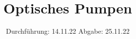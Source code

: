 

\subject{V21}
\title{Optisches Pumpen}
\date{%
  Durchführung: 14.11.22
  \hspace{3em}
  Abgabe: 25.11.22
}



\maketitle
\thispagestyle{empty}
\tableofcontents
\newpage






%

\printbibliography{}


